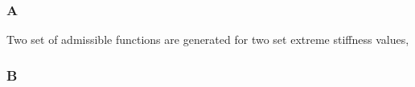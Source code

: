 \documentclass{beamer}
\begin{document}
\begin{frame}[label=foo]
\frametitle{A}
Two set of admissible functions are generated for two set extreme stiffness values, \hyperlink{bar}{}
\end{frame}

\begin{frame}[label=bar]
\frametitle{B}
\hyperlink{foo}{}
\end{frame}
\end{document}
